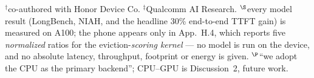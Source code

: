 \begin{table}[tb]
\vspace{2pt}
{\footnotesize $^{\dagger}$co-authored with Honor Device Co. \quad $^{\ddagger}$Qualcomm AI Research. \quad
$^{\S}$every model result (LongBench, NIAH, and the headline 30\% end-to-end TTFT gain) is measured on A100; the phone appears only in App.~H.4, which reports five \emph{normalized} ratios for the eviction-\emph{scoring kernel} --- no model is run on the device, and no absolute latency, throughput, footprint or energy is given. \quad
$^{\P}$``we adopt the CPU as the primary backend''; CPU--GPU is Discussion~2, future work.}
\end{table}
